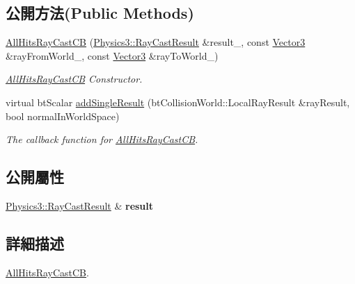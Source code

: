 \subsection*{公開方法(Public Methods)}
\begin{DoxyCompactItemize}
\item 
\hyperlink{struct_magnum_1_1_all_hits_ray_cast_c_b_adfe42fa5f9f1ecc83309f5b9569087b9}{All\+Hits\+Ray\+Cast\+CB} (\hyperlink{class_magnum_1_1_physics3_1_1_ray_cast_result}{Physics3\+::\+Ray\+Cast\+Result} \&result\+\_\+, const \hyperlink{class_magnum_1_1_vector3}{Vector3} \&ray\+From\+World\+\_\+, const \hyperlink{class_magnum_1_1_vector3}{Vector3} \&ray\+To\+World\+\_\+)
\begin{DoxyCompactList}\small\item\em \hyperlink{struct_magnum_1_1_all_hits_ray_cast_c_b}{All\+Hits\+Ray\+Cast\+CB} Constructor. \end{DoxyCompactList}\item 
virtual bt\+Scalar \hyperlink{struct_magnum_1_1_all_hits_ray_cast_c_b_ac33cd8d6f7793cef3de6a31a29a0428f}{add\+Single\+Result} (bt\+Collision\+World\+::\+Local\+Ray\+Result \&ray\+Result, bool normal\+In\+World\+Space)
\begin{DoxyCompactList}\small\item\em The callback function for \hyperlink{struct_magnum_1_1_all_hits_ray_cast_c_b}{All\+Hits\+Ray\+Cast\+CB}. \end{DoxyCompactList}\end{DoxyCompactItemize}
\subsection*{公開屬性}
\begin{DoxyCompactItemize}
\item 
\hyperlink{class_magnum_1_1_physics3_1_1_ray_cast_result}{Physics3\+::\+Ray\+Cast\+Result} \& {\bfseries result}\hypertarget{struct_magnum_1_1_all_hits_ray_cast_c_b_a9df255e0ce8dc19c7af2608d76a1878f}{}\label{struct_magnum_1_1_all_hits_ray_cast_c_b_a9df255e0ce8dc19c7af2608d76a1878f}

\end{DoxyCompactItemize}


\subsection{詳細描述}
\hyperlink{struct_magnum_1_1_all_hits_ray_cast_c_b}{All\+Hits\+Ray\+Cast\+CB}. 

